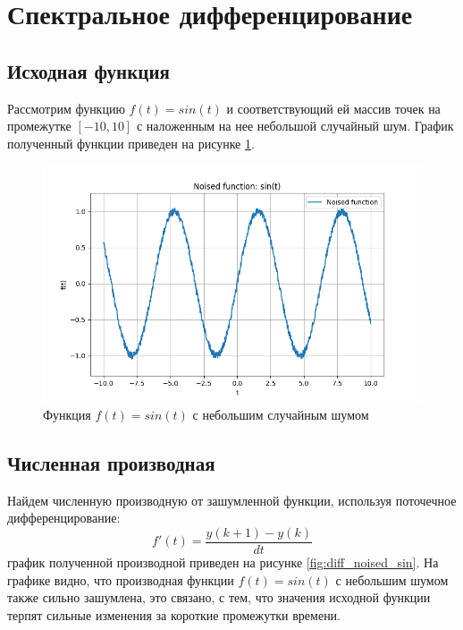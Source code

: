 \section{Спектральное дифференцирование}

\subsection{Исходная функция}
Рассмотрим функцию $f(t) = sin(t)$ и соответствующий ей массив точек на промежутке $[-10, 10]$ с 
наложенным на нее небольшой случайный шум. График полученный функции приведен на рисунке \ref{fig:noised_sin}.

\begin{figure}[ht!]
    \centering
    \includegraphics[width=\textwidth]{../results/10/noised_sin.png}
    \caption{Функция $f(t) = sin(t)$ с небольшим случайным шумом}
    \label{fig:noised_sin}
\end{figure}

\FloatBarrier
\subsection{Численная производная}
Найдем численную производную от зашумленной функции, используя поточечное дифференцирование: 
\begin{equation}
    f'(t) = \frac{y(k + 1) -  y(k)}{dt}
\end{equation}
график полученной производной приведен на рисунке \ref{fig:diff_noised_sin}.
На графике видно, что производная функции $f(t) = sin(t)$ с небольшим шумом также сильно зашумлена,
это связано, с тем, что значения исходной функции терпят сильные изменения за короткие промежутки времени.

